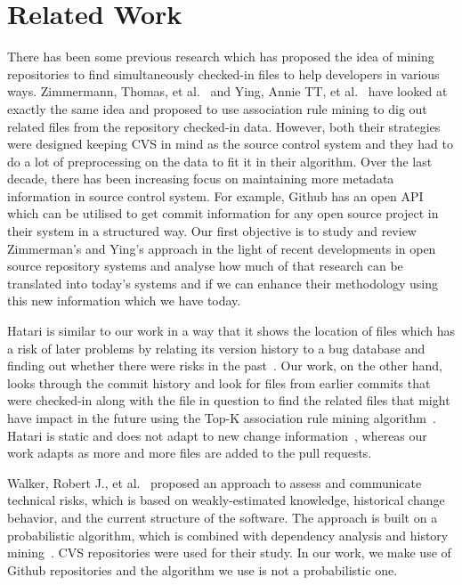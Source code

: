 
\section{Related Work}
\label{sec:related}

There has been some previous research which has proposed the idea of mining repositories to find simultaneously checked-in files to help developers in various ways. Zimmermann, Thomas, et al.~\cite{zimmermann2005mining} and Ying, Annie TT, et al.~\cite{ying2004predicting} have looked at exactly the same idea and proposed to use association rule mining to dig out related files from the repository checked-in data. However, both their strategies were designed keeping CVS in mind as the source control system and they had to do a lot of preprocessing on the data to fit it in their algorithm. Over the last decade, there has been increasing focus on maintaining more metadata information in source control system. For example, Github has an open API which can be utilised to get commit information for any open source project in their system in a structured way. Our first objective is to study and review Zimmerman's and Ying's approach in the light of recent developments in open source repository systems and analyse how much of that research can be translated into today's systems and if we can enhance their methodology using this new information which we have today.

Hatari is similar to our work in a way that it shows the location of files which has a risk of later problems by relating its version history to a bug database and finding out whether there were risks in the past~\cite{sliwerski2005hatari}. Our work, on the other hand, looks through the commit history and look for files from earlier commits that were checked-in along with the file in question to find the related files that might have impact in the future using the Top-K association rule mining algorithm~\cite{fournier2012mining}. Hatari is static and does not adapt to new change information~\cite{kim2007predicting}, whereas our work adapts as more and more files are added to the pull requests.

Walker, Robert J., et al.~\cite{walker2006lightweight} proposed an approach to assess and communicate technical risks, which is based on weakly-estimated knowledge, historical change behavior, and the current structure of the software. The approach is built on a probabilistic algorithm, which is combined with dependency analysis and history mining~\cite{lehnert2011review}. CVS repositories were used for their study. In our work, we make use of Github repositories and the algorithm we use is not a probabilistic one.






